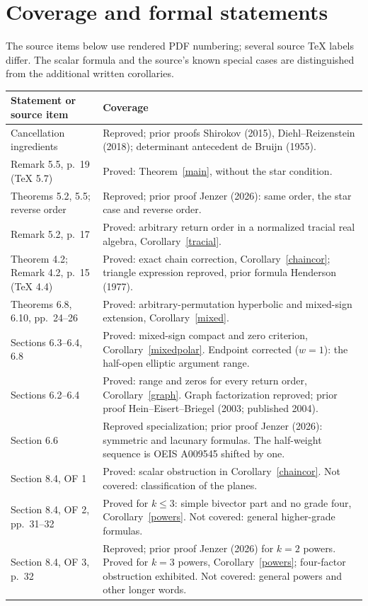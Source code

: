 \documentclass[11pt]{article}
\begin{document}
\section{Coverage and formal statements}
The source items below use rendered PDF numbering; several source TeX
labels differ. The scalar formula and the source's known special cases
are distinguished from the additional written corollaries.

\begin{center}\small
\begin{tabular}{@{}p{.30\linewidth}p{.64\linewidth}@{}}
\toprule Statement or source item & Coverage\\\midrule
Cancellation ingredients & Reproved; prior proofs Shirokov (2015), Diehl--Reizenstein (2018); determinant antecedent de Bruijn (1955).\\
Remark 5.5, p.~19 (TeX 5.7) & Proved: Theorem~\ref{main}, without the star condition.\\
Theorems 5.2, 5.5; reverse order & Reproved; prior proof Jenzer (2026): same order, the star case and reverse order.\\
Remark 5.2, p.~17 & Proved: arbitrary return order in a normalized tracial real algebra, Corollary~\ref{tracial}.\\
Theorem 4.2; Remark 4.2, p.~15 (TeX 4.4) & Proved: exact chain correction, Corollary~\ref{chaincor}; triangle expression reproved, prior formula Henderson (1977).\\
Theorems 6.8, 6.10, pp.~24--26 & Proved: arbitrary-permutation hyperbolic and mixed-sign extension, Corollary~\ref{mixed}.\\
Sections 6.3--6.4, 6.8 & Proved: mixed-sign compact and zero criterion, Corollary~\ref{mixedpolar}. Endpoint corrected ($w=1$): the half-open elliptic argument range.\\
Sections 6.2--6.4 & Proved: range and zeros for every return order, Corollary~\ref{graph}. Graph factorization reproved; prior proof Hein--Eisert--Briegel (2003; published 2004).\\
Section 6.6 & Reproved specialization; prior proof Jenzer (2026): symmetric and lacunary formulas. The half-weight sequence is OEIS A009545 shifted by one.\\
Section 8.4, OF 1 & Proved: scalar obstruction in Corollary~\ref{chaincor}. Not covered: classification of the planes.\\
Section 8.4, OF 2, pp.~31--32 & Proved for $k\leq3$: simple bivector part and no grade four, Corollary~\ref{powers}. Not covered: general higher-grade formulas.\\
Section 8.4, OF 3, p.~32 & Reproved; prior proof Jenzer (2026) for $k=2$ powers. Proved for $k=3$ powers, Corollary~\ref{powers}; four-factor obstruction exhibited. Not covered: general powers and other longer words.\\
\bottomrule
\end{tabular}
\end{center}
\end{document}
